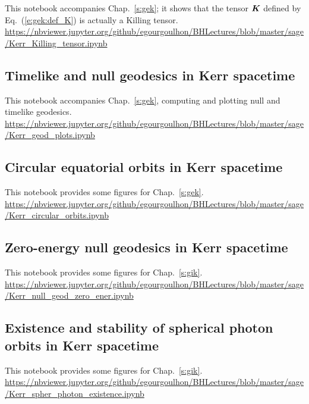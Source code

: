 This notebook accompanies Chap.~\ref{s:gek}; it shows that the
tensor $\bm{K}$ defined by Eq.~(\ref{e:gek:def_K}) is actually a Killing tensor.\\[1ex]
{\footnotesize
\url{https://nbviewer.jupyter.org/github/egourgoulhon/BHLectures/blob/master/sage/Kerr_Killing_tensor.ipynb}
}


\subsection{Timelike and null geodesics in Kerr spacetime} \label{s:sam:Kerr_geod_plots}

This notebook accompanies Chap.~\ref{s:gek}, computing and plotting null and timelike geodesics.\\[1ex]
{\footnotesize
\url{https://nbviewer.jupyter.org/github/egourgoulhon/BHLectures/blob/master/sage/Kerr_geod_plots.ipynb}
}

\subsection{Circular equatorial orbits in Kerr spacetime} \label{s:sam:Kerr_circular_orbits}

This notebook provides some figures for Chap.~\ref{s:gek}.\\[1ex]
{\footnotesize
\url{https://nbviewer.jupyter.org/github/egourgoulhon/BHLectures/blob/master/sage/Kerr_circular_orbits.ipynb}
}

\subsection{Zero-energy null geodesics in Kerr spacetime} \label{s:sam:Kerr_null_geod_zero_ener}

This notebook provides some figures for Chap.~\ref{s:gik}.\\[1ex]
{\footnotesize
\url{https://nbviewer.jupyter.org/github/egourgoulhon/BHLectures/blob/master/sage/Kerr_null_geod_zero_ener.ipynb}
}

\subsection{Existence and stability of spherical photon orbits in Kerr spacetime} \label{s:sam:Kerr_spher_photon_existence}

This notebook provides some figures for Chap.~\ref{s:gik}.\\[1ex]
{\footnotesize
\url{https://nbviewer.jupyter.org/github/egourgoulhon/BHLectures/blob/master/sage/Kerr_spher_photon_existence.ipynb}
}

